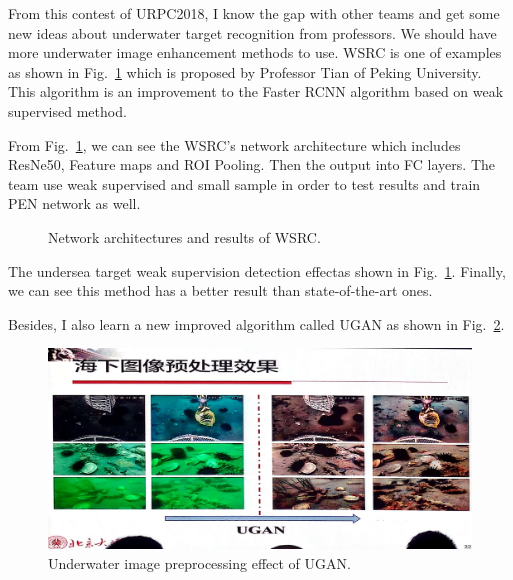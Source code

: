 \documentclass[a4paper]{article}
\begin{document}
	From this contest of URPC2018, I know the gap with other teams and get some new ideas about underwater target recognition from professors. We should have more underwater image enhancement methods to use. WSRC is one of examples as shown in Fig.~\ref{p1} which is proposed by Professor Tian of Peking University. This algorithm is an improvement to the Faster RCNN algorithm based on weak supervised method.
	
	From Fig.~\ref{p1}, we can see the WSRC's network architecture which includes ResNe50, Feature maps and ROI Pooling. Then the output into FC layers. The team use weak supervised and small sample in order to test results and train PEN network as well.
	
	\begin{figure}
		\centering 
		\caption{Network architectures and results of WSRC.}
		\label{p1}
	\end{figure}
	
    The undersea target weak supervision detection effectas shown in Fig.~\ref{p1}. Finally, we can see this method has a better result than state-of-the-art ones.
    
    Besides, I also learn a new improved algorithm called UGAN as shown in Fig.~\ref{p2}. 
     \begin{figure}
	    \begin{center}
		 \includegraphics[scale=0.1]{figures/3.jpg}
		\end{center}
		\caption{Underwater image preprocessing effect of UGAN.}
		\label{p2}
	\end{figure} 
	
\end{document}
